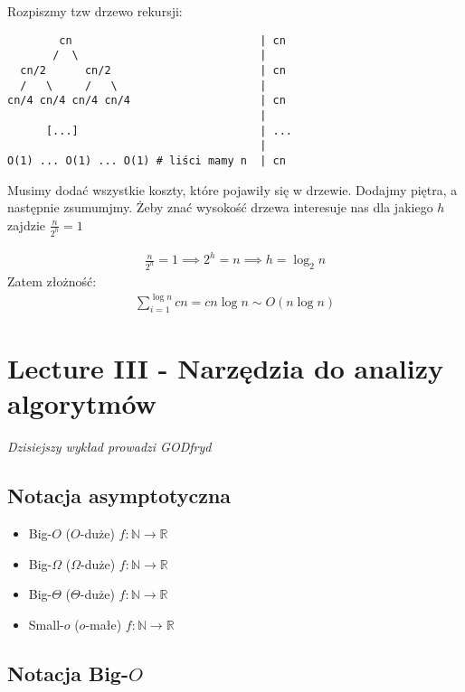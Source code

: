 \documentclass{article}
\numberwithin{equation}{subsection}
\begin{document}
\newpage

\noindent
Rozpiszmy tzw drzewo rekursji:

\begin{verbatim}
        cn                             | cn
       /  \                            |
  cn/2      cn/2                       | cn
  /   \     /   \                      |
cn/4 cn/4 cn/4 cn/4                    | cn
                                       |
      [...]                            | ...
                                       |
O(1) ... O(1) ... O(1) # liści mamy n  | cn
\end{verbatim}

\noindent
Musimy dodać wszystkie koszty, które pojawiły się w drzewie. Dodajmy piętra, a następnie zsumumjmy. 
Żeby znać wysokość drzewa interesuje nas dla jakiego $h$ zajdzie $\frac{n}{2^h} = 1$

\begin{align}
    \frac{n}{2^h} = 1 \implies 2^h = n \implies h = \log_2 n
\end{align}
Zatem złożność:
\begin{align}
    \sum_{i=1}^{\log n} cn = cn\log n \sim O(n\log n)
\end{align}

\section{Lecture III - Narzędzia do analizy algorytmów}

\textit{Dzisiejszy wykład prowadzi GODfryd}

\subsection{Notacja asymptotyczna}

\begin{itemize}
    \item Big-$O$ ($O$-duże) $f: \mathbb{N} \rightarrow \mathbb{R}$
    \item Big-$\Omega$ ($\Omega$-duże) $f: \mathbb{N} \rightarrow \mathbb{R}$
    \item Big-$\Theta$ ($\Theta$-duże) $f: \mathbb{N} \rightarrow \mathbb{R}$
    \item Small-$o$ ($o$-małe) $f: \mathbb{N} \rightarrow \mathbb{R}$
\end{itemize}

\subsection{Notacja Big-$O$}
\end{document}
